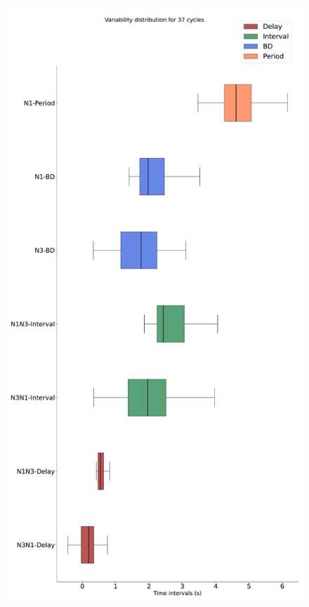 \begin{figure}[htbp]
\begin{minipage}[b]{0.43\textwidth}
		\includegraphics[width=\textwidth]{./invariants/data/SUSSEX/CV1a_driven3/images/stim_cv1a3_boxplot.pdf}
	\end{minipage}
	\begin{minipage}[b]{0.55\textwidth}
		\centering

\end{minipage}
\end{figure}
